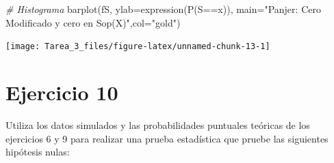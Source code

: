 \documentclass[
]{article}
\newenvironment{Shaded}{\begin{snugshade}}{\end{snugshade}}
\newcommand{\AttributeTok}[1]{\textcolor[rgb]{0.77,0.63,0.00}{#1}}
\newcommand{\CommentTok}[1]{\textcolor[rgb]{0.56,0.35,0.01}{\textit{#1}}}
\newcommand{\FunctionTok}[1]{\textcolor[rgb]{0.00,0.00,0.00}{#1}}
\newcommand{\NormalTok}[1]{#1}
\newcommand{\SpecialCharTok}[1]{\textcolor[rgb]{0.00,0.00,0.00}{#1}}
\newcommand{\StringTok}[1]{\textcolor[rgb]{0.31,0.60,0.02}{#1}}
\begin{document}
\begin{Shaded}
\begin{Highlighting}[]
\CommentTok{\# Histograma}
\FunctionTok{barplot}\NormalTok{(fS, }\AttributeTok{ylab=}\FunctionTok{expression}\NormalTok{(}\FunctionTok{P}\NormalTok{(S}\SpecialCharTok{==}\NormalTok{x)), }
        \AttributeTok{main=}\StringTok{"Panjer: Cero Modificado y cero en Sop(X)"}\NormalTok{,}\AttributeTok{col=}\StringTok{"gold"}\NormalTok{)}
\end{Highlighting}
\end{Shaded}

\begin{center}\texttt{[image: Tarea\_3\_files/figure-latex/unnamed-chunk-13-1]} \end{center}

\hypertarget{ejercicio-10}{%
\section{Ejercicio 10}\label{ejercicio-10}}

Utiliza los datos simulados y las probabilidades puntuales teóricas de
los ejercicios 6 y 9 para realizar una prueba estadística que pruebe las
siguientes hipótesis nulas:
\end{document}
